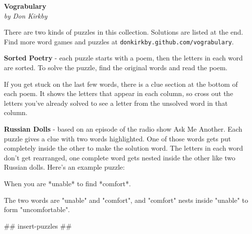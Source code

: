 \documentclass[letterpaper,10pt]{extarticle}
\begin{document}
\begin{center}
   \Large\textbf{Vograbulary}\\
   \large\textit{by Don Kirkby}
\end{center}
{\fontsize{10pt}{0.1em}\selectfont
There are two kinds of puzzles in this collection. Solutions are listed at the
end. Find more word games and puzzles at
\texttt{donkirkby.github.com/vograbulary}.

\textbf{Sorted Poetry} - each puzzle starts with a poem, then the letters in
each word are sorted. To solve the puzzle, find the original words and read the
poem.

If you get stuck on the last few words, there is a clue section at the bottom of
each poem. It shows the letters that appear in each column, so cross out the
letters you've already solved to see a letter from the unsolved word in that
column.

\textbf{Russian Dolls} - based on an episode of the radio show Ask Me Another.
Each puzzle gives a clue with two words highlighted. One of those words gets put
completely inside the other to make the solution word. The letters in each word
don't get rearranged, one complete word gets nested inside the other like two
Russian dolls. Here's an example puzzle:

When you are *unable* to find *comfort*.

The two words are "unable" and "comfort", and "comfort" nests inside "unable" to
form "uncomfortable".
}

## insert-puzzles ##
\end{document}
